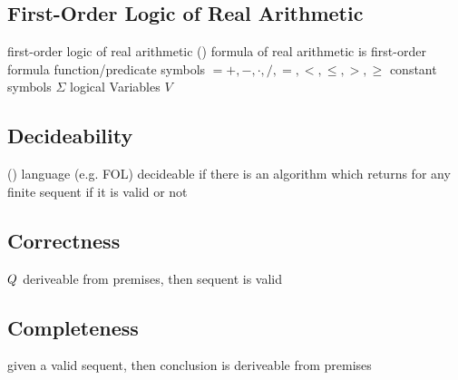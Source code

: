         \subsection{First-Order Logic of Real Arithmetic}
            \label{sec:FOL-R}

            first-order logic of real arithmetic (\FOLR)
            formula of real arithmetic
            is first-order formula
            function/predicate symbols $ = {+,-,\cdot,/,=,<,\leq,>,\geq}$
            constant symbols $\Sigma$
            logical Variables $V$

        \subsection{Decideability}
            \label{sec:decideability}

            (\cite{hodges2001ClassicalLogic})
            language (e.g. FOL) decideable if there is an algorithm which returns for any finite sequent if it is valid or not

        \subsection{Correctness}
            \label{sec:correctness}

            $Q$ deriveable from premises, then sequent is valid

        \subsection{Completeness}
            \label{sec:completeness}

            given a valid sequent, then conclusion is deriveable from premises

